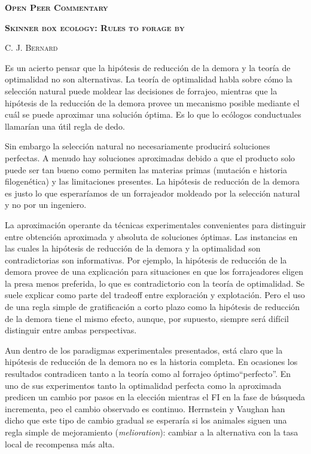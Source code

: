 \documentclass[a4paper,12pt]{article}
\begin{document}
\newpage

{\Large\scshape\bfseries Open Peer Commentary}

{\scshape\bfseries Skinner box ecology: Rules to forage by}

{\scshape C. J. Bernard}

Es un acierto pensar que la hipótesis de reducción de la demora y la teoría de optimalidad no son alternativas. La teoría de optimalidad habla sobre cómo la selección natural puede moldear las decisiones de forrajeo, mientras que la hipótesis de la reducción de la demora provee un mecanismo posible mediante el cuál se puede aproximar una solución óptima. Es lo que lo ecólogos conductuales llamarían una útil regla de dedo. 

Sin embargo la selección natural no necesariamente producirá soluciones perfectas. A menudo hay soluciones aproximadas debido a que el producto solo puede ser tan bueno como permiten las materias primas (mutación e historia filogenética) y las limitaciones presentes. La hipótesis de reducción de la demora es justo lo que esperaríamos de un forrajeador moldeado por la selección natural y no por un ingeniero.

La aproximación operante da técnicas experimentales convenientes para distinguir entre obtención aproximada y absoluta de soluciones óptimas. Las instancias en las cuales la hipótesis de reducción de la demora y la optimalidad son contradictorias son informativas. Por ejemplo, la hipótesis de reducción de la demora provee de una explicación para situaciones en que los forrajeadores eligen la presa menos preferida, lo que es contradictorio con la teoría de optimalidad. Se suele explicar como parte del tradeoff entre exploración y explotación. Pero el uso de una regla simple de gratificación a corto plazo como la hipótesis de reducción de la demora tiene el mismo efecto, aunque, por supuesto, siempre será difícil distinguir entre ambas perspectivas.

Aun dentro de los paradigmas experimentales presentados, está claro que la hipótesis de reducción de la demora no es la historia completa. En ocasiones los resultados contradicen tanto a la teoría como al forrajeo óptimo``perfecto''. En uno de sus experimentos tanto la optimalidad perfecta como la aproximada predicen un cambio por pasos en la elección mientras el FI en la fase de búsqueda incrementa, peo el cambio observado es continuo. Herrnstein y Vaughan han dicho que este tipo de cambio gradual se esperaría si los animales siguen una regla simple de mejoramiento ({\itshape melioration}): cambiar a la alternativa con la tasa local de recompensa más alta.
\end{document}
